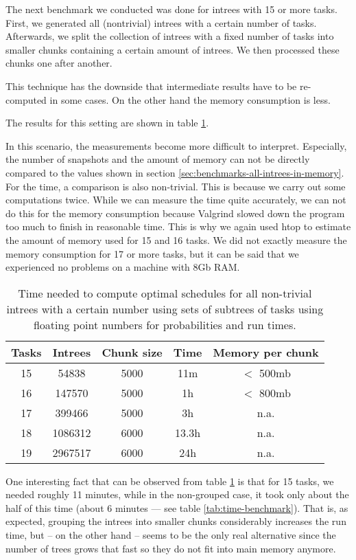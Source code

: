 The next benchmark we conducted was done for intrees with 15 or more tasks. First, we generated all (nontrivial) intrees with a certain number of tasks. Afterwards, we split the collection of intrees with a fixed number of tasks into smaller chunks containing a certain amount of intrees. We then processed these chunks one after another. 

This technique has the downside that intermediate results have to be re-computed in some cases. On the other hand the memory consumption is less.

The results for this setting are shown in table \ref{tab:benchmark-clustered-run-time}.

In this scenario, the measurements become more difficult to interpret. Especially, the number of snapshots and the amount of memory can not be directly compared to the values shown in section \ref{sec:benchmarks-all-intrees-in-memory}. For the time, a comparison is also non-trivial. This is because we carry out some computations twice. While we can measure the time quite accurately, we can not do this for the memory consumption because Valgrind slowed down the program too much to finish in reasonable time. This is why we again used htop to estimate the amount of memory used for 15 and 16 tasks. We did not exactly measure the memory consumption for 17 or more tasks, but it can be said that we experienced no problems on a machine with 8Gb RAM.

\begin{table}[ht]
  \centering
  \begin{tabular}[ht]{ccccc}
    Tasks & Intrees & Chunk size & Time & Memory per chunk \\
    \hline
    15 & 54838 & 5000 & 11m & $<$ 500mb \\
    16 & 147570 & 5000 & 1h & $<$ 800mb \\
    17 & 399466 & 5000 & 3h & n.a. \\
    18 & 1086312 & 6000 & 13.3h & n.a. \\
    19 & 2967517 & 6000 & 24h & n.a.
  \end{tabular}
  \caption{Time needed to compute optimal schedules for all non-trivial intrees  with a certain number using sets of subtrees of tasks using floating point numbers for probabilities and run times.}
  \label{tab:benchmark-clustered-run-time}
\end{table}

One interesting fact that can be observed from table \ref{tab:benchmark-clustered-run-time} is that for 15 tasks, we needed roughly 11 minutes, while in the non-grouped case, it took only about the half of this time (about 6 minutes --- see table \ref{tab:time-benchmark}). That is, as expected, grouping the intrees into smaller chunks considerably increases the run time, but -- on the other hand -- seems to be the only real alternative since the number of trees grows that fast so they do not fit into main memory anymore.

